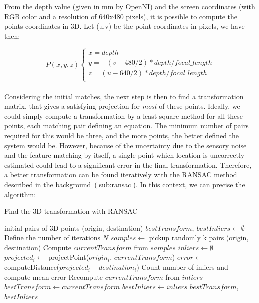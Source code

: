 From the depth value (given in mm by OpenNI) and the screen coordinates (with RGB color and a resolution of 640x480 pixels), it is possible to compute the points coordinates in 3D. Let (u,v) be the point coordinates in pixels, we have then:

\[
P(x,y,z)\left\{
\begin{array}{l}
x = depth \\
y = -(v - 480/2) * depth / focal\_length \\
z = (u - 640/2) * depth / focal\_length \\
\end{array}
\right.
\]

\paragraph{}
Considering the initial matches, the next step is then to find a transformation matrix, that gives a satisfying projection for \emph{most} of these points. Ideally, we could simply compute a transformation by a least square method for all these points, each matching pair defining an equation. The minimum number of pairs required for this would be three, and the more points, the better defined the system would be. However, because of the uncertainty due to the sensory noise and the feature matching by itself, a single point which location is uncorrectly estimated could lead to a significant error in the final transformation. Therefore, a better transformation can be found iteratively with the \gls{RANSAC} method described in the background~(\ref{sub:ransac}). In this context, we can precise the algorithm:

\begin{algorithm}[H]
\caption{Find the 3D transformation with RANSAC}
\begin{algorithmic}
\REQUIRE initial pairs of 3D points (origin, destination)
\STATE $bestTransform,\:bestInliers \gets \emptyset$
\STATE Define the number of iterations $N$
 \STATE $samples \gets$ pickup randomly k pairs (origin, destination)
 \STATE Compute $currentTransform$ from $samples$
 \STATE $inliers \gets \emptyset$
  \STATE $projected_i \gets$ projectPoint($origin_i$, $currentTransform$)
  \STATE $error \gets$ computeDistance($projected_i - destination_i$)
  \ENDIF
 \ENDFOR
 \STATE Count number of inliers and compute mean error
  \STATE Recompute $currentTransform$ from $inliers$
   \STATE $bestTransform \gets currentTransform$
   \STATE $bestInliers \gets inliers$
  \ENDIF
 \ENDIF
\ENDFOR
\RETURN $bestTransform$, $bestInliers$
\end{algorithmic}
\end{algorithm}

